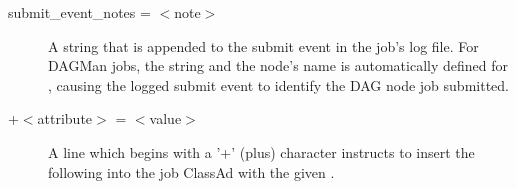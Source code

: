 \begin{description}

\label{man-condor-submit-submit-event-notes}
\item[submit\_event\_notes = $<$note$>$]
A string that is appended to the submit event in the job's log file.
For DAGMan jobs, the string  and the node's name is
automatically defined for ,
causing the logged submit event to identify the DAG node job submitted. 


\item[+$<$attribute$>$ = $<$value$>$] A line which begins with a '+'
(plus) character instructs  to insert the
following  into the job ClassAd with the given 
. 

\end{description} 

